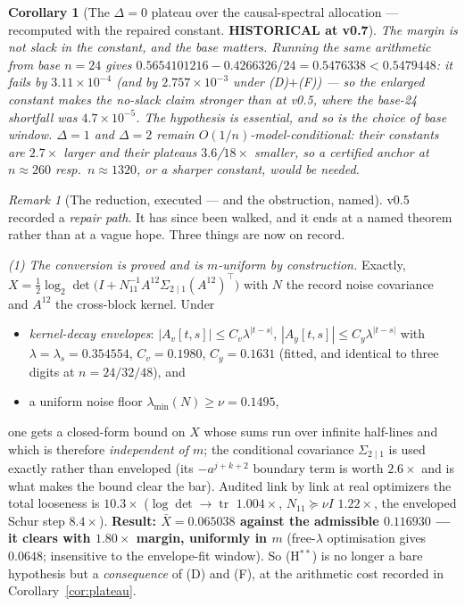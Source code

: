\documentclass[11pt]{article}
\newtheorem{corollary}{Corollary}
\theoremstyle{definition}
\theoremstyle{remark}
\newtheorem{remark}{Remark}
\begin{document}
\begin{corollary}[The $\Delta=0$ plateau over the causal-spectral
allocation --- recomputed with the repaired constant.
\textbf{HISTORICAL at v0.7}]
\emph{The margin is not slack in the constant, and the base matters.}
Running the same arithmetic from base $n=24$ gives
$0.5654101216-0.4266326/24=0.5476338<0.5479448$: it \emph{fails} by
$3.11\times10^{-4}$ (and by $2.757\times10^{-3}$ under (D)$+$(F)) ---
so the enlarged constant makes the no-slack claim \emph{stronger} than
at v0.5, where the base-24 shortfall was $4.7\times10^{-5}$. The
hypothesis is essential, and so is the choice of base
window. $\Delta=1$ and $\Delta=2$ remain
$O(1/n)$-model-conditional: their constants are $2.7\times$ larger and
their plateaus $3.6$/$18\times$ smaller, so a certified anchor at
$n\approx260$ resp.\ $n\approx1320$, or a sharper constant, would be
needed.
\end{corollary}

\begin{remark}[The reduction, executed --- and the obstruction, named]
\label{rem:repair}
v0.5 recorded a \emph{repair path}. It has since been walked, and it
ends at a named theorem rather than at a vague hope. Three things are
now on record.

\emph{(1) The conversion is proved and is $m$-uniform by
construction.} Exactly,
$X=\tfrac12\log_2\det\bigl(I+N_{11}^{-1}A^{12}\Sigma_{2\mid1}
(A^{12})^{\!\top}\bigr)$ with $N$ the record noise covariance and
$A^{12}$ the cross-block kernel. Under
\begin{itemize}
\item[(D)] \emph{kernel-decay envelopes}: $|A_v[t,s]|\le
C_v\lambda^{|t-s|}$, $|A_y[t,s]|\le C_y\lambda^{|t-s|}$ with
$\lambda=\lambda_s=0.354554$, $C_v=0.1980$, $C_y=0.1631$
(fitted, and identical to three digits at $n=24/32/48$), and
\item[(F)] a uniform noise floor $\lambda_{\min}(N)\ge\nu=0.1495$,
\end{itemize}
one gets a closed-form bound on $X$ whose sums run over infinite
half-lines and which is therefore \emph{independent of $m$}; the
conditional covariance $\Sigma_{2\mid1}$ is used exactly rather than
enveloped (its $-a^{j+k+2}$ boundary term is worth $2.6\times$ and is
what makes the bound clear the bar). Audited link by link at real
optimizers the total looseness is $10.3\times$
($\log\det\to\operatorname{tr}$ $1.004\times$, $N_{11}\succeq\nu I$
$1.22\times$, the enveloped Schur step $8.4\times$). \textbf{Result:
$\bar X=0.065038$ against the admissible $0.116930$ --- it clears with
$1.80\times$ margin, uniformly in $m$} (free-$\lambda$ optimisation
gives $0.0648$; insensitive to the envelope-fit window). So
(H$^{\ast\ast}$) is no longer a bare hypothesis but a
\emph{consequence} of (D) and (F), at the arithmetic cost recorded in
Corollary~\ref{cor:plateau}.


\end{remark}
\end{document}
